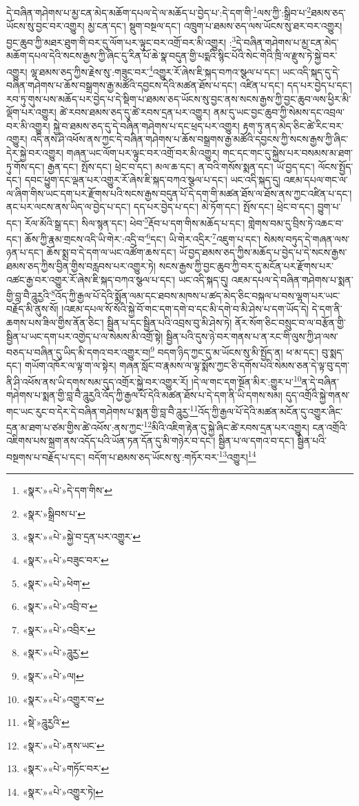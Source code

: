 དེ་བཞིན་གཤེགས་པ་མྱ་ངན་མེད་མཆོག་དཔལ་དེ་ལ་མཆོད་པ་བྱེད་པ་:དེ་དག་གི་\footnote{«སྣར་»«པེ་»དེ་དག་གིས་}ལས་ཀྱི་:སྒྲིབ་པ་\footnote{«སྣར་»སྒྲིབས་པ་}ཐམས་ཅད་ཡོངས་སུ་བྱང་བར་འགྱུར། མྱ་ངན་དང་། སྡུག་བསྔལ་དང་། འཁྲུག་པ་ཐམས་ཅད་ལས་ཡོངས་སུ་ཐར་བར་འགྱུར། བྱང་ཆུབ་ཀྱི་མཐར་ཐུག་གི་བར་དུ་ལོག་པར་ལྟུང་བར་འགྲོ་བར་མི་འགྱུར། :\footnote{«སྣར་»«པེ་»སྐྱེ་བ་དྲན་པར་འགྱུར་}དེ་བཞིན་གཤེགས་པ་མྱ་ངན་མེད་མཆོག་དཔལ་དེའི་སངས་རྒྱས་ཀྱི་ཞིང་དུ་རིན་པོ་ཆེ་སྣ་བདུན་གྱི་པདྨའི་སྙིང་པོའི་སེང་གེའི་ཁྲི་ལ་རྫུས་ཏེ་སྐྱེ་བར་འགྱུར། ལྷ་ཐམས་ཅད་ཀྱིས་རྗེས་སུ་:གཟུང་བར་\footnote{«སྣར་»«པེ་»བཟུང་བར་}འགྱུར་རོ་ཞེས་ཇི་སྐད་བཀའ་སྩལ་པ་དང་། ཡང་འདི་སྐད་དུ་དེ་བཞིན་གཤེགས་པ་ཆོས་བསྒྲགས་རྒྱ་མཚོའི་དབྱངས་དེའི་མཚན་ཐོས་པ་དང་། འཛིན་པ་དང་། དད་པར་བྱེད་པ་དང་། རབ་ཏུ་གུས་པས་མཆོད་པར་བྱེད་པ་དེ་སྡིག་པ་ཐམས་ཅད་ཡོངས་སུ་བྱང་ནས་སངས་རྒྱས་ཀྱི་བྱང་ཆུབ་ལས་ཕྱིར་མི་ལྡོག་པར་འགྱུར། ཚེ་རབས་ཐམས་ཅད་དུ་ཚེ་རབས་དྲན་པར་འགྱུར། ནམ་དུ་ཡང་བྱང་ཆུབ་ཀྱི་སེམས་དང་འབྲལ་བར་མི་འགྱུར། སྐྱེ་བ་ཐམས་ཅད་དུ་དེ་བཞིན་གཤེགས་པ་དང་ཕྲད་པར་འགྱུར། རྟག་ཏུ་ནད་མེད་ཅིང་ཚེ་རིང་བར་འགྱུར། འདི་ནས་ཤི་འཕོས་ནས་ཀྱང་དེ་བཞིན་གཤེགས་པ་ཆོས་བསྒྲགས་རྒྱ་མཚོའི་དབྱངས་ཀྱི་སངས་རྒྱས་ཀྱི་ཞིང་དེར་སྐྱེ་བར་འགྱུར། གཞན་ཡང་ལོག་པར་ལྟུང་བར་འགྲོ་བར་མི་འགྱུར། གང་དང་གང་དུ་སྐྱེས་པར་བསམས་མ་ཐག་ཏུ་གོས་དང་། རྒྱན་དང་། སྤོས་དང་། ཕྲེང་བ་དང་། མལ་ཆ་དང་། ན་བའི་གསོས་སྨན་དང་། ཡོ་བྱད་དང་། ལོངས་སྤྱོད་དང་། དབང་ཕྱུག་དང་ལྡན་པར་འགྱུར་རོ་ཞེས་ཇི་སྐད་བཀའ་སྩལ་པ་དང་། ཡང་འདི་སྐད་དུ། འཇམ་དཔལ་གང་ལ་ལ་ཞིག་གིས་ཡང་དག་པར་རྫོགས་པའི་སངས་རྒྱས་བདུན་པོ་དེ་དག་གི་མཚན་ཐོས་ལ་ཐོས་ནས་ཀྱང་འཛིན་པ་དང་། ནང་པར་ལངས་ནས་ཡིད་ལ་བྱེད་པ་དང་། དད་པར་བྱེད་པ་དང་། མེ་ཏོག་དང་། སྤོས་དང་། ཕྲེང་བ་དང་། བྱུག་པ་དང་། རོལ་མོའི་སྒྲ་དང་། སིལ་སྙན་དང་། ཕེབ་\footnote{«སྣར་»«པེ་»ཕེག་}རྡོབ་པ་དག་གིས་མཆོད་པ་དང་། གླེགས་བམ་དུ་བྲིས་ཏེ་འཆང་བ་དང་། ཆོས་ཀྱི་རྣམ་གྲངས་འདི་ཡི་གེར་:འདྲི་བ་\footnote{«སྣར་»«པེ་»འབྲི་བ་}དང་། ཡི་གེར་འདྲིར་\footnote{«སྣར་»«པེ་»འབྲིར་}འཇུག་པ་དང་། སེམས་བཏུད་དེ་གཞན་ལས་ཉན་པ་དང་། ཆོས་སྨྲ་བ་དེ་དག་ལ་ཡང་འཚོག་ཆས་དང་། ཡོ་བྱད་ཐམས་ཅད་ཀྱིས་མཆོད་པ་བྱེད་པ་དེ་སངས་རྒྱས་ཐམས་ཅད་ཀྱིས་བྱིན་གྱིས་བརླབས་པར་འགྱུར་ཏེ། སངས་རྒྱས་ཀྱི་བྱང་ཆུབ་ཀྱི་བར་དུ་མངོན་པར་རྫོགས་པར་འཚང་རྒྱ་བར་འགྱུར་རོ་ཞེས་ཇི་སྐད་བཀའ་སྩལ་པ་དང་། ཡང་འདི་སྐད་དུ། འཇམ་དཔལ་དེ་བཞིན་གཤེགས་པ་སྨན་གྱི་བླ་བཻ་ཌཱུརྱའི་\footnote{«སྣར་»«པེ་»ཌཱུརྱ་}འོད་ཀྱི་རྒྱལ་པོ་དེའི་སྨོན་ལམ་དང་ཐབས་མཁས་པ་ཚད་མེད་ཅིང་བསྐལ་པ་བས་ལྷག་པར་ཡང་བརྗོད་མི་ནུས་སོ། །འཇམ་དཔལ་སོ་སོའི་སྐྱེ་བོ་གང་དག་དགེ་བ་དང་མི་དགེ་བ་མི་ཤེས་པ་དག་ཡོད་དེ། དེ་དག་ནི་ཆགས་པས་ཟིལ་གྱིས་ནོན་ཅིང་། སྦྱིན་པ་དང་སྦྱིན་པའི་འབྲས་བུ་མི་ཤེས་ཏེ། ནོར་སོག་ཅིང་བསྲུང་བ་ལ་བརྩོན་གྱི་སྦྱིན་པ་ཡང་དག་པར་འགྱེད་པ་ལ་སེམས་མི་འགྲོ་སྟེ། སྦྱིན་པའི་དུས་ཉེ་བར་གནས་པ་ན་རང་གི་ལུས་ཀྱི་ཤ་ལས་བཅད་པ་བཞིན་དུ་ཡིད་མི་དགའ་བར་འགྱུར་བ།\footnote{«སྣར་»«པེ་»ལ།} བདག་ཉིད་ཀྱང་དུ་མ་ཡོངས་སུ་མི་སྤྱོད་ན། ཕ་མ་དང་། བུ་སྨད་དང་། གཡོག་འཁོར་ལ་ལྟ་ག་ལ་སྟེར། གཞན་སློང་བ་རྣམས་ལ་ལྟ་སྨོས་ཀྱང་ཅི་དགོས་པའི་སེམས་ཅན་དེ་ལྟ་བུ་དག་ནི་ཤི་འཕོས་ནས་ཡི་དགས་སམ་དུད་འགྲོར་སྐྱེ་བར་འགྱུར་རོ། །དེ་ལ་གང་དག་སྔོན་མིར་:གྱུར་པ་\footnote{«སྣར་»«པེ་»འགྱུར་བ་}ན་དེ་བཞིན་གཤེགས་པ་སྨན་གྱི་བླ་བཻ་ཌཱུརྱའི་འོད་ཀྱི་རྒྱལ་པོ་དེའི་མཚན་ཐོས་པ་དེ་དག་ནི་ཡི་དགས་སམ། དུད་འགྲོའི་སྐྱེ་གནས་གང་ཡང་རུང་བ་དེར་དེ་བཞིན་གཤེགས་པ་སྨན་གྱི་བླ་བཻ་ཌཱུརྱ་\footnote{«སྡེ་»ཌཱུརྱའི་}འོད་ཀྱི་རྒྱལ་པོ་དེའི་མཚན་མངོན་དུ་འགྱུར་ཞིང་དྲན་མ་ཐག་པ་ཙམ་གྱིས་ཚེ་འཕོས་:ནས་ཀྱང་\footnote{«སྣར་»«པེ་»ནས་ཡང་}མིའི་འཇིག་རྟེན་དུ་སྐྱེ་ཞིང་ཚེ་རབས་དྲན་པར་འགྱུར། ངན་འགྲོའི་འཇིགས་པས་སྐྲག་ནས་འདོད་པའི་ཡོན་ཏན་དོན་དུ་མི་གཉེར་བ་དང་། སྦྱིན་པ་ལ་དགའ་བ་དང་། སྦྱིན་པའི་བསྔགས་པ་བརྗོད་པ་དང་། བདོག་པ་ཐམས་ཅད་ཡོངས་སུ་:གཏོར་བར་\footnote{«སྣར་»«པེ་»གཏོང་བར་}འགྱུར།\footnote{«སྣར་»«པེ་»འགྱུར་ཏེ།} 